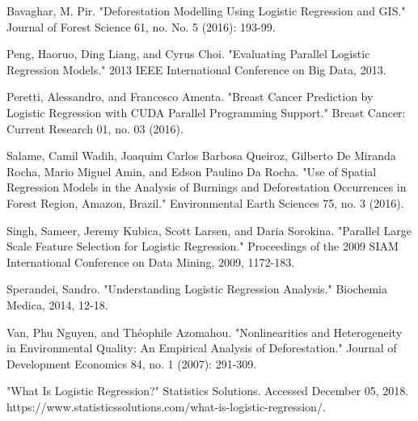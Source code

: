 \documentclass[letterpaper, 10 pt, conference]{ieeeconf}  %
\begin{document}
\begin{thebibliography}{99}


 Bavaghar, M. Pir. "Deforestation Modelling Using Logistic Regression and GIS." Journal of Forest Science 61, no. No. 5 (2016): 193-99. 

 Peng, Haoruo, Ding Liang, and Cyrus Choi. "Evaluating Parallel Logistic Regression Models." 2013 IEEE International Conference on Big Data, 2013. 

 Peretti, Alessandro, and Francesco Amenta. "Breast Cancer Prediction by Logistic Regression with CUDA Parallel Programming Support." Breast Cancer: Current Research 01, no. 03 (2016).

 Salame, Camil Wadih, Joaquim Carlos Barbosa Queiroz, Gilberto De Miranda Rocha, Mario Miguel Amin, and Edson Paulino Da Rocha. "Use of Spatial Regression Models in the Analysis of Burnings and Deforestation Occurrences in Forest Region, Amazon, Brazil." Environmental Earth Sciences 75, no. 3 (2016). 

 Singh, Sameer, Jeremy Kubica, Scott Larsen, and Daria Sorokina. "Parallel Large Scale Feature Selection for Logistic Regression." Proceedings of the 2009 SIAM International Conference on Data Mining, 2009, 1172-183. 

 Sperandei, Sandro. "Understanding Logistic Regression Analysis." Biochemia Medica, 2014, 12-18.

 Van, Phu Nguyen, and Théophile Azomahou. "Nonlinearities and Heterogeneity in Environmental Quality: An Empirical Analysis of Deforestation." Journal of Development Economics 84, no. 1 (2007): 291-309. 

 "What Is Logistic Regression?" Statistics Solutions. Accessed December 05, 2018. https://www.statisticssolutions.com/what-is-logistic-regression/.







\end{thebibliography}
\end{document}
